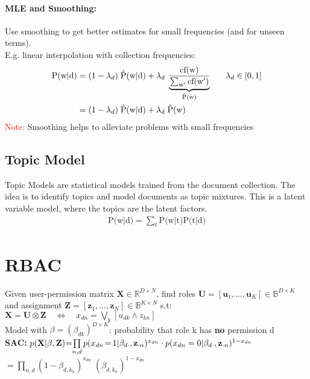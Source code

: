 \documentclass[a4paper,11pt]{article}
\newcommand{\R}{\mathbb{R}}
\newcommand{\B}{\mathbb{B}}
\newcommand{\msection}[1]{\section{#1}\vspace{-0.5mm}}
\newcommand{\cf}{\text{cf(w)}} %
\begin{document}
\begin{multicols}{2}
\paragraph{MLE and Smoothing:} Use smoothing to get better estimates for small frequencies (and for unseen terms).\\
E.g. linear interpolation with collection frequencies:
\begin{align*}
  \text{P(w$|$d)} &= (1 - \lambda_d) \; \hat{\text P}\text{(w$|$d)} + \lambda_d \; \underbrace{\frac{\cf}{\sum_{\text w'} \text{cf(w$'$)}}}_{\hat{\text P}(\text w)} \hspace{0.6cm} \lambda_d \in [0, 1] \\
                  &= (1 - \lambda_d) \; \hat{\text P}\text{(w$|$d)} + \lambda_d \; \hat{\text{P}} \text{(w)}
\end{align*}
\textcolor{red}{Note:} Smoothing helps to alleviate problems with small frequencies

\subsection{Topic Model}
Topic Models are statistical models trained from the document collection. The idea is to identify topics and model documents as topic mixtures. This is a latent variable model, where the topics are the latent factors. 
\begin{align*}
  \text{P(w$|$d)} = \sum_t \text{P(w$|$t)} \text{P(t$|$d)}
\end{align*}

\msection{RBAC}
Given user-permission matrix $\mathbf X \in \R^{D \times N}$, find roles $\mathbf U = [\mathbf{u}_1, \ldots, \mathbf{u}_K] \in \B^{D \times K}$ and assignment $\mathbf Z = [\mathbf{z}_1, \ldots, \mathbf{z}_N] \in \B^{K \times N}$ s.t:\\
$\mathbf X = \mathbf U \otimes \mathbf Z \quad \Longleftrightarrow \quad x_{dn} = \bigvee_k [u_{dk} \land z_{kn}]$\\
\vspace{0.2cm}
Model with $\beta = (\beta_{dk})^{D \times K}$: probability that role k has \textbf{no} permission d\\
\textbf{SAC:} ${p(\mathbf X|\mathbf \beta, \mathbf Z) \hspace{-0.08cm} = \hspace{-0.1cm} \prod\limits_{n,d} p(x_{dn} \hspace{-0.05cm} = \hspace{-0.05cm} 1| \beta_{d \cdot}, \mathbf{z}_{\cdot n})^{x_{dn}} \cdot p(x_{dn} = 0 | \beta_{d \cdot}, \mathbf{z}_{\cdot n})^{1 - x_{dn}}}$\\ 
\hspace{2.55cm}$= \prod\limits_{n,d}(1-\beta_{d, k_n})^{x_{dn}} \; (\beta_{d, k_n})^{1-x_{dn}}$\\


\end{multicols}
\end{document}
